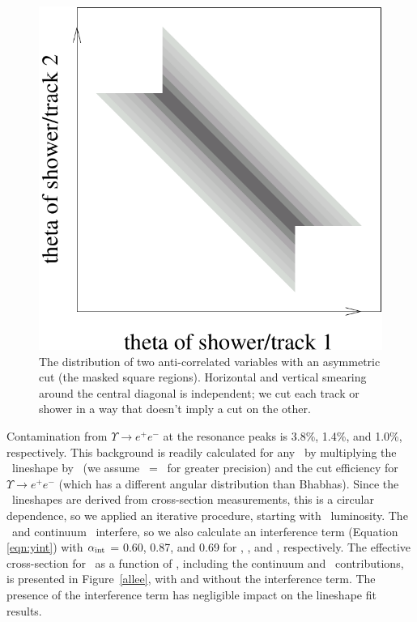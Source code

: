 \documentclass{cornell}
\begin{document}
\begin{figure}[p]
  \begin{center}
    \includegraphics[width=0.4\linewidth]{plots/asymmetriccartoon}
  \end{center}
  \caption[Distribution provided by an asymmetric
  cut]{\label{asymmetriccartoon} The distribution of two
  anti-correlated variables with an asymmetric cut (the masked square
  regions).  Horizontal and vertical smearing around the central
  diagonal is independent; we cut each track or shower in a way that
  doesn't imply a cut on the other.}
\end{figure}

Contamination from $\Upsilon \to e^+e^-$ at the resonance peaks is
3.8\%, 1.4\%, and 1.0\%, respectively.  This background is readily
calculated for any \ecm\ by multiplying the \ups\ lineshape by \bee\
(we assume \bee\ = \bmm\ for greater precision) and the cut efficiency
for $\Upsilon \to e^+e^-$ (which has a different angular distribution
than Bhabhas).  Since the \ups\ lineshapes are derived from
cross-section measurements, this is a circular dependence, so we
applied an iterative procedure, starting with \gamgam\ luminosity.
The \ups\ and continuum \ee\ interfere, so we also calculate an
interference term (Equation \ref{eqn:yint}) with $\alpha_{\mbox{\scriptsize int}}$ =
0.60, 0.87, and 0.69 for \us, \uss, and \usss, respectively.  The
effective cross-section for \ee\ as a function of \ecm, including the
continuum and \ups\ contributions, is presented in Figure~\ref{allee},
with and without the interference term.  The presence of the
interference term has negligible impact on the lineshape fit results.
\end{document}
